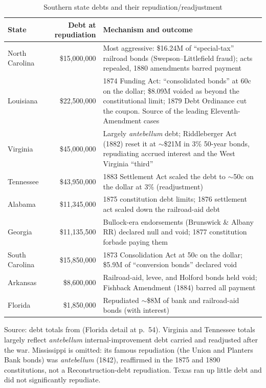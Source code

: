 \documentclass[12pt]{article}
\begin{document}
\begin{table}[htbp]
\centering
\caption{Southern state debts and their repudiation/readjustment}
\label{tab:states}
\small
\begin{tabular}{l r p{7.6cm}}
\toprule
State & Debt at repudiation & Mechanism and outcome \\
\midrule
North Carolina & \$15{,}000{,}000 & Most aggressive: \$16.24M of ``special-tax'' railroad bonds (Swepson--Littlefield fraud); acts repealed, 1880 amendments barred payment \\
Louisiana & \$22{,}500{,}000 & 1874 Funding Act: ``consolidated bonds'' at 60c on the dollar; \$8.09M voided as beyond the constitutional limit; 1879 Debt Ordinance cut the coupon. Source of the leading Eleventh-Amendment cases \\
Virginia & \$45{,}000{,}000 & Largely \emph{antebellum} debt; Riddleberger Act (1882) reset it at $\sim$\$21M in 3\% 50-year bonds, repudiating accrued interest and the West Virginia ``third'' \\
Tennessee & \$43{,}950{,}000 & 1883 Settlement Act scaled the debt to $\sim$50c on the dollar at 3\% (readjustment) \\
Alabama & \$11{,}345{,}000 & 1875 constitution debt limits; 1876 settlement act scaled down the railroad-aid debt \\
Georgia & \$11{,}135{,}500 & Bullock-era endorsements (Brunswick \& Albany RR) declared null and void; 1877 constitution forbade paying them \\
South Carolina & \$15{,}850{,}000 & 1873 Consolidation Act at 50c on the dollar; \$5.9M of ``conversion bonds'' declared void \\
Arkansas & \$8{,}600{,}000 & Railroad-aid, levee, and Holford bonds held void; Fishback Amendment (1884) barred all payment \\
Florida & \$1{,}850{,}000 & Repudiated $\sim$\$8M of bank and railroad-aid bonds (with interest) \\
\bottomrule
\end{tabular}

\smallskip
\footnotesize Source: debt totals from \citet[215]{scott1893repudiation} (Florida
detail at p.~54). Virginia and Tennessee totals largely reflect \emph{antebellum}
internal-improvement debt carried and readjusted after the war. Mississippi is
omitted: its famous repudiation (the Union and Planters Bank bonds) was
\emph{antebellum} (1842), reaffirmed in the 1875 and 1890 constitutions, not a
Reconstruction-debt repudiation. Texas ran up little debt and did not
significantly repudiate.
\end{table}
\end{document}
